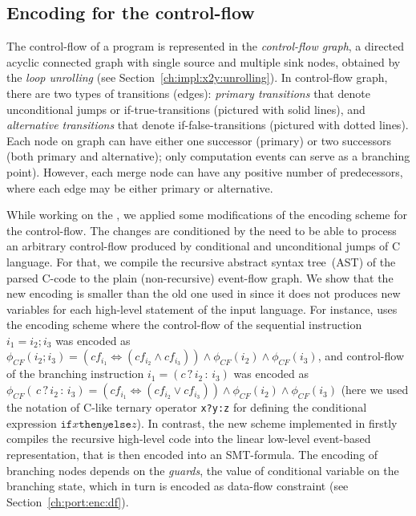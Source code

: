 \subsection{Encoding for the control-flow} %
\label{ch:port:enc:cf}

The control-flow of a program is represented in the \textit{control-flow graph}, a directed acyclic connected graph with single source and multiple sink nodes, obtained by the \textit{loop unrolling} (see Section~\ref{ch:impl:x2y:unrolling}).%
In control-flow graph, there are two types of transitions (edges): \textit{primary transitions} that denote unconditional jumps or if-true-transitions (pictured with solid lines), and \textit{alternative transitions} that denote if-false-transitions (pictured with dotted lines). Each node on graph can have either one successor (primary) or two successors (both primary and alternative); only computation events can serve as a branching point). However, each merge node can have any positive number of predecessors, where each edge may be either primary or alternative.

While working on the , we applied some modifications of the encoding scheme for the control-flow. The changes are conditioned by the need to be able to process an arbitrary control-flow produced by conditional and unconditional jumps of C language. 
For that, we compile the recursive abstract syntax tree~(AST) of the parsed C-code to the plain (non-recursive) event-flow graph.
We show %
that the new encoding is smaller than the old one used in \Porthos since it does not produces new variables for each high-level statement of the input language.
For instance, \Porthos uses the encoding scheme where the control-flow of the sequential instruction $i_1 = i_2; i_3$ was encoded as
$\phi_{CF}(i_2;i_3) = (cf_{i_1} \Leftrightarrow (cf_{i_2} \land cf_{i_3})) \land \phi_{CF}(i_2) \land \phi_{CF}(i_3)$,
and control-flow of the branching instruction $i_1 = (c \, ? \, i_2 \, : \, i_3)$ was encoded as
$\phi_{CF}( \, c \, ? \, i_2 \, : \, i_3) = (cf_{i_1} \Leftrightarrow (cf_{i_2} \lor cf_{i_3})) \land \phi_{CF}(i_2) \land \phi_{CF}(i_3)$
(here we used the notation of C-like ternary operator \texttt{x?y:z} for defining the conditional expression $\mathtt{if} x \mathtt{then} y \mathtt{else} z$).
In contrast, the new scheme implemented in  firstly compiles the recursive high-level code into the linear low-level event-based representation, that is then encoded into an SMT-formula. The encoding of branching nodes depends on the \textit{guards}, the value of conditional variable on the branching state, which in turn is encoded as data-flow constraint (see Section~\ref{ch:port:enc:df}).

